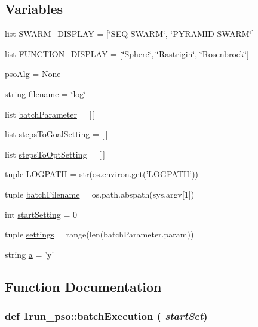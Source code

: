 \subsection*{Variables}
\begin{CompactItemize}
\item 
list \hyperlink{namespace1run__pso_b9cbda5bab84f9f8207f19b9260bd6b0}{SWARM\_\-DISPLAY} = \mbox{[}\char`\"{}SEQ-SWARM\char`\"{}, \char`\"{}PYRAMID-SWARM\char`\"{}\mbox{]}
\item 
list \hyperlink{namespace1run__pso_2cd64d144b00d2fa5d33aef3f5dc5ba6}{FUNCTION\_\-DISPLAY} = \mbox{[}\char`\"{}Sphere\char`\"{}, \char`\"{}\hyperlink{classRastrigin}{Rastrigin}\char`\"{}, \char`\"{}\hyperlink{classRosenbrock}{Rosenbrock}\char`\"{}\mbox{]}
\item 
\hyperlink{namespace1run__pso_fde51d1399f109eb6961b09b2b48203f}{psoAlg} = None
\item 
string \hyperlink{namespace1run__pso_2d967f08751a6276aa70648cf43e574f}{filename} = \char`\"{}log\char`\"{}
\item 
list \hyperlink{namespace1run__pso_720ec17ab043f3be0371a0042ee88001}{batchParameter} = \mbox{[}$\,$\mbox{]}
\item 
list \hyperlink{namespace1run__pso_f32304253baa1276fdb0ca14d8ab0ac5}{stepsToGoalSetting} = \mbox{[}$\,$\mbox{]}
\item 
list \hyperlink{namespace1run__pso_89359e300d669e1cf00ab2f5ca28347c}{stepsToOptSetting} = \mbox{[}$\,$\mbox{]}
\item 
tuple \hyperlink{namespace1run__pso_b8fdfee817fe1970a4a8548265edd97b}{LOGPATH} = str(os.environ.get('\hyperlink{namespace1run__pso_b8fdfee817fe1970a4a8548265edd97b}{LOGPATH}'))
\item 
tuple \hyperlink{namespace1run__pso_479302628de9aa78f7c3e664d9ced3e9}{batchFilename} = os.path.abspath(sys.argv\mbox{[}1\mbox{]})
\item 
int \hyperlink{namespace1run__pso_534b665c5bbb9b1220f0dc9b7dcb594a}{startSetting} = 0
\item 
tuple \hyperlink{namespace1run__pso_f3a5da1c01a1c9220a5d339ba0c12a56}{settings} = range(len(batchParameter.param))
\item 
string \hyperlink{namespace1run__pso_5667fa615eba918b5eeacb60b34d416e}{a} = 'y'
\end{CompactItemize}


\subsection{Function Documentation}
\hypertarget{namespace1run__pso_86e2a58b6a7a817f1f49c277acbfe403}{
\subsubsection{\setlength{\rightskip}{0pt plus 5cm}def 1run\_\-pso::batchExecution ( {\em startSet})}}
\label{namespace1run__pso_86e2a58b6a7a817f1f49c277acbfe403}


